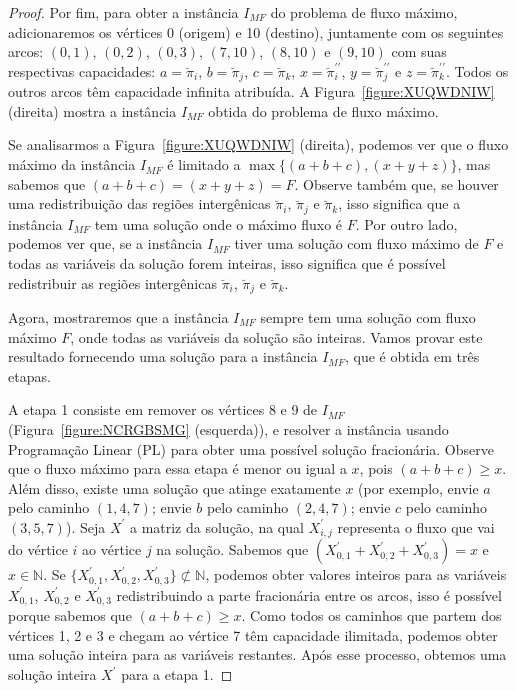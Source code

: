 \begin{proof}
Por fim, para obter a instância $I_{MF}$ do problema de fluxo máximo, adicionaremos os vértices 0 (origem) e 10 (destino), juntamente com os seguintes arcos: $(0,1)$, $(0, 2)$, $(0,3)$, $(7,10)$, $(8,10)$ e $(9,10)$ com suas respectivas capacidades: $a=\breve\pi_i$, $b=\breve\pi_j$, $c=\breve\pi_k$, $x=\breve\pi^{\prime\prime}_i$, $y=\breve\pi^{\prime\prime}_j $ e $z=\breve\pi^{\prime\prime}_k$. Todos os outros arcos têm capacidade infinita atribuída. A Figura~\ref{figure:XUQWDNIW} (direita) mostra a instância $I_{MF}$ obtida do problema de fluxo máximo.



Se analisarmos a Figura~\ref{figure:XUQWDNIW} (direita), podemos ver que o fluxo máximo da instância $I_{MF}$ é limitado a $\max\{(a+b+c),(x+ y+z)\}$, mas sabemos que $(a+b+c) = (x+y+z) = F$. Observe também que, se houver uma redistribuição das regiões intergênicas $\breve\pi_i$, $\breve\pi_j$ e $\breve\pi_k$, isso significa que a instância $I_{MF}$ tem uma solução onde o máximo fluxo é $F$. Por outro lado, podemos ver que, se a instância $I_{MF}$ tiver uma solução com fluxo máximo de $F$ e todas as variáveis da solução forem inteiras, isso significa que é possível redistribuir as regiões intergênicas $\breve \pi_i$, $\breve\pi_j$ e $\breve\pi_k$.

Agora, mostraremos que a instância $I_{MF}$ sempre tem uma solução com fluxo máximo $F$, onde todas as variáveis da solução são inteiras. Vamos provar este resultado fornecendo uma solução para a instância $I_{MF}$, que é obtida em três etapas.

A etapa 1 consiste em remover os vértices 8 e 9 de $I_{MF}$ (Figura~\ref{figure:NCRGBSMG} (esquerda)), e resolver a instância usando Programação Linear (PL) para obter uma possível solução fracionária. Observe que o fluxo máximo para essa etapa é menor ou igual a $x$, pois $(a+b+c) \ge x$. Além disso, existe uma solução que atinge exatamente $x$ (por exemplo, envie $a$ pelo caminho $(1,4,7)$; envie $b$ pelo caminho $(2,4,7)$; envie $c$ pelo caminho $(3,5,7)$). Seja $X^{\prime}$ a matriz da solução, na qual $X^{\prime}_{i,j}$ representa o fluxo que vai do vértice $i$ ao vértice $j$ na solução. Sabemos que $(X^{\prime}_{0,1}+X^{\prime}_{0,2}+X^{\prime}_{0,3}) = x$ e $x \in \mathbb{N}$. Se $\{X^{\prime}_{0,1},X^{\prime}_{0,2},X^{\prime}_{0,3}\} \not\subset \mathbb {N}$, podemos obter valores inteiros para as variáveis $X^{\prime}_{0,1}$, $X^{\prime}_{0,2}$ e $X^{\prime }_{0,3}$ redistribuindo a parte fracionária entre os arcos, isso é possível porque sabemos que $(a+b+c) \ge x$. Como todos os caminhos que partem dos vértices 1, 2 e 3 e chegam ao vértice 7 têm capacidade ilimitada, podemos obter uma solução inteira para as variáveis restantes. Após esse processo, obtemos uma solução inteira $X^{\prime}$ para a etapa 1.


\end{proof}
